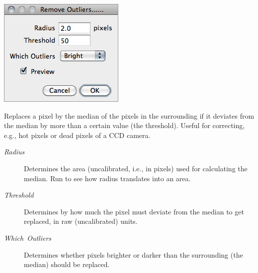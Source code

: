 \begin{minipage}[c][1\totalheight][t]{0.335\columnwidth}%
\includegraphics[scale=0.55]{images/RemoveOutliers}%
\end{minipage}%
\begin{minipage}[c][1\totalheight][t]{0.665\columnwidth}%
Replaces a pixel by the median of the pixels in the surrounding if
it deviates from the median by more than a certain value (the threshold).
Useful for correcting, e.g., hot pixels or dead pixels of a CCD camera.
\begin{description}
\item [{\emph{Radius}}] Determines the area (uncalibrated, i.e., in pixels)
used for calculating the median. Run 
to see how radius translates into an area. \end{description}
%
\end{minipage}
\begin{description}
\item [{\emph{Threshold}}] Determines by how much the pixel must deviate
from the median to get replaced, in raw (uncalibrated) units. 
\item [{\emph{Which\ Outliers}}] Determines whether pixels brighter or
darker than the surrounding (the median) should be replaced. 
\end{description}



\subsubsection[\protect\userinterface{Remove NaNs\ldots{}}]{\protect{}\label{sub:Remove-NaNs...}}

